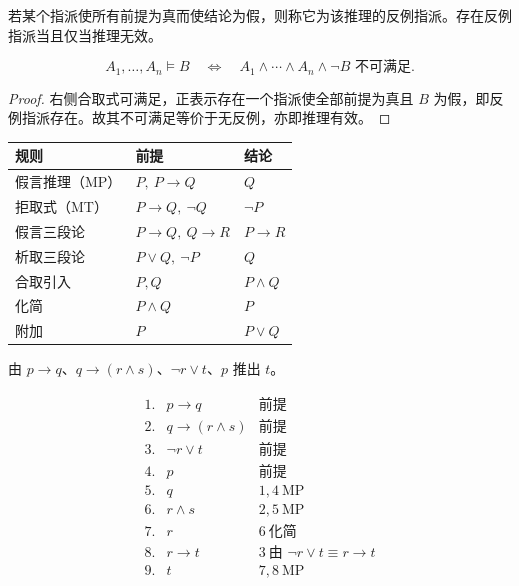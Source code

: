 \begin{definition}[反例指派]\label{ch1-countervaluation}
若某个指派使所有前提为真而使结论为假，则称它为该推理的反例指派。存在反例指派当且仅当推理无效。
\end{definition}

\begin{theorem}[不可满足判据]\label{ch1-unsat-criterion}
\[
A_1,\ldots,A_n\vDash B
\quad\Longleftrightarrow\quad
A_1\land\cdots\land A_n\land\neg B
\text{ 不可满足}.
\]
\end{theorem}
\begin{proof}
右侧合取式可满足，正表示存在一个指派使全部前提为真且 $B$ 为假，即反例指派存在。故其不可满足等价于无反例，亦即推理有效。
\end{proof}

\begin{center}\small
\begin{tabular}{lll}
\toprule
规则 & 前提 & 结论\\
\midrule
假言推理（MP） & $P,\ P\to Q$ & $Q$\\
拒取式（MT） & $P\to Q,\ \neg Q$ & $\neg P$\\
假言三段论 & $P\to Q,\ Q\to R$ & $P\to R$\\
析取三段论 & $P\lor Q,\ \neg P$ & $Q$\\
合取引入 & $P,Q$ & $P\land Q$\\
化简 & $P\land Q$ & $P$\\
附加 & $P$ & $P\lor Q$\\
\bottomrule
\end{tabular}
\end{center}

\begin{example}[title={逐行证明}]\label{ch1-line-proof}
由 $p\to q$、$q\to(r\land s)$、$\neg r\lor t$、$p$ 推出 $t$。
\begin{solution}
\[
\begin{array}{rll}
1.&p\to q&\text{前提}\\
2.&q\to(r\land s)&\text{前提}\\
3.&\neg r\lor t&\text{前提}\\
4.&p&\text{前提}\\
5.&q&1,4\ \text{MP}\\
6.&r\land s&2,5\ \text{MP}\\
7.&r&6\ \text{化简}\\
8.&r\to t&3\ \text{由 }\neg r\lor t\equiv r\to t\\
9.&t&7,8\ \text{MP}
\end{array}
\]
\end{solution}
\end{example}

